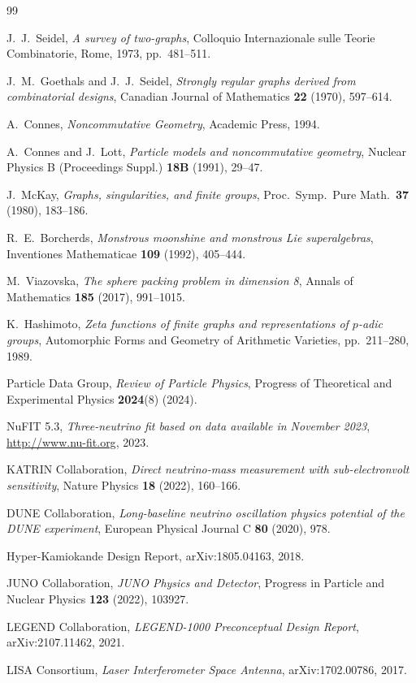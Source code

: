 \documentclass[12pt,a4paper]{article}
\begin{document}

\begin{thebibliography}{99}

J.~J.~Seidel,
\textit{A survey of two-graphs},
Colloquio Internazionale sulle Teorie Combinatorie, Rome, 1973,
pp.~481--511.

J.~M.~Goethals and J.~J.~Seidel,
\textit{Strongly regular graphs derived from combinatorial designs},
Canadian Journal of Mathematics \textbf{22} (1970), 597--614.

A.~Connes,
\textit{Noncommutative Geometry},
Academic Press, 1994.

A.~Connes and J.~Lott,
\textit{Particle models and noncommutative geometry},
Nuclear Physics B (Proceedings Suppl.) \textbf{18B} (1991), 29--47.

J.~McKay,
\textit{Graphs, singularities, and finite groups},
Proc.~Symp.~Pure Math.~\textbf{37} (1980), 183--186.

R.~E.~Borcherds,
\textit{Monstrous moonshine and monstrous Lie superalgebras},
Inventiones Mathematicae \textbf{109} (1992), 405--444.

M.~Viazovska,
\textit{The sphere packing problem in dimension 8},
Annals of Mathematics \textbf{185} (2017), 991--1015.

K.~Hashimoto,
\textit{Zeta functions of finite graphs and representations of
$p$-adic groups},
Automorphic Forms and Geometry of Arithmetic Varieties,
pp.~211--280, 1989.

Particle Data Group,
\textit{Review of Particle Physics},
Progress of Theoretical and Experimental Physics \textbf{2024}(8)
(2024).

NuFIT 5.3,
\textit{Three-neutrino fit based on data available in November 2023},
\url{http://www.nu-fit.org}, 2023.

KATRIN Collaboration,
\textit{Direct neutrino-mass measurement with sub-electronvolt
sensitivity},
Nature Physics \textbf{18} (2022), 160--166.

DUNE Collaboration,
\textit{Long-baseline neutrino oscillation physics potential of the
DUNE experiment},
European Physical Journal C \textbf{80} (2020), 978.

Hyper-Kamiokande Design Report, arXiv:1805.04163, 2018.

JUNO Collaboration,
\textit{JUNO Physics and Detector},
Progress in Particle and Nuclear Physics \textbf{123} (2022), 103927.

LEGEND Collaboration,
\textit{LEGEND-1000 Preconceptual Design Report},
arXiv:2107.11462, 2021.

LISA Consortium,
\textit{Laser Interferometer Space Antenna},
arXiv:1702.00786, 2017.

\end{thebibliography}
\end{document}
